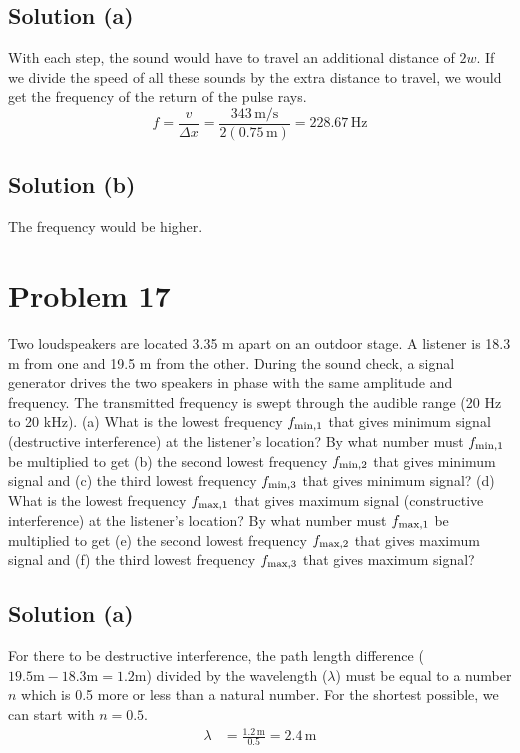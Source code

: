 \documentclass[12pt]{article}
\begin{document}
        \subsection{Solution (a)}
            With each step, the sound would have to travel an additional distance of $2w$.
            If we divide the speed of all these sounds by the extra distance to travel, we would get the frequency of the return of the pulse rays.
            \begin{equation}
                f   =   \frac{v}{\Delta x}
                    =   \frac{343\,\unit{\meter/\second}}{2(0.75\,\unit{\meter})}
                    =   \boxed{228.67\,\unit{\hertz}}
            \end{equation}
        
        \subsection{Solution (b)}
            The frequency would be higher.

    \pagebreak
    \section{Problem 17}
        Two loudspeakers are located 3.35 m apart on an outdoor stage. 
        A listener is 18.3 m from one and 19.5 m from the other. 
        During the sound check, a signal generator drives the two speakers in phase with the same amplitude and frequency.
        The transmitted frequency is swept through the audible range (20 Hz to 20 kHz). 
        (a) What is the lowest frequency $f_{\rm min,1}$ that gives minimum signal (destructive interference) at the listener's location? 
        By what number must $f_{\rm min,1}$ be multiplied to get (b) the second lowest frequency $f_{\rm min,2}$ that gives minimum signal and (c) the third lowest frequency $f_{\rm min,3}$ that gives minimum signal? 
        (d) What is the lowest frequency $f_{\rm max,1}$ that gives maximum signal (constructive interference) at the listener's location? 
        By what number must $f_{\rm max,1}$ be multiplied to get (e) the second lowest frequency $f_{\rm max,2}$ that gives maximum signal and (f) the third lowest frequency $f_{\rm max,3}$ that gives maximum signal?

        \subsection{Solution (a)}
            For there to be destructive interference, the path length difference ($19.5\unit{\meter} - 18.3\unit{\meter} = 1.2\unit{\meter}$) divided by the wavelength ($\lambda$) must be equal to a number $n$ which is 0.5 more or less than a natural number.
            For the shortest possible, we can start with $n = 0.5$.
            \begin{align}
                \lambda &=  \frac{1.2\,\unit{\meter}}{0.5}
                    =   2.4\,\unit{\meter}
            \end{align}
\end{document}
